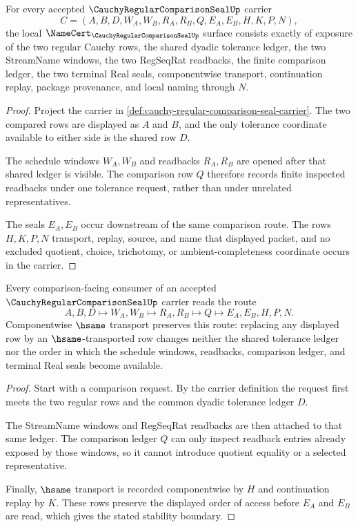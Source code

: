 \begin{theorem}
\label{thm:cauchy-regular-comparison-seal-obligations}
For every accepted $\CauchyRegularComparisonSealUp$ carrier
$$
C=(A,B,D,W_A,W_B,R_A,R_B,Q,E_A,E_B,H,K,P,N),
$$
the local $\NameCert_{\CauchyRegularComparisonSealUp}$ surface consists exactly of exposure of the two regular Cauchy rows, the shared dyadic tolerance ledger, the two StreamName windows, the two RegSeqRat readbacks, the finite comparison ledger, the two terminal Real seals, componentwise transport, continuation replay, package provenance, and local naming through $N$.
\end{theorem}
\begin{proof}
Project the carrier in \autoref{def:cauchy-regular-comparison-seal-carrier}. The two compared rows are displayed as $A$ and $B$, and the only tolerance coordinate available to either side is the shared row $D$.

The schedule windows $W_A,W_B$ and readbacks $R_A,R_B$ are opened after that shared ledger is visible. The comparison row $Q$ therefore records finite inspected readbacks under one tolerance request, rather than under unrelated representatives.

The seals $E_A,E_B$ occur downstream of the same comparison route. The rows $H,K,P,N$ transport, replay, source, and name that displayed packet, and no excluded quotient, choice, trichotomy, or ambient-completeness coordinate occurs in the carrier.
\end{proof}

\begin{theorem}
\label{thm:cauchy-regular-comparison-seal-stability}
Every comparison-facing consumer of an accepted $\CauchyRegularComparisonSealUp$ carrier reads the route
$$
A,B,D \longmapsto W_A,W_B \longmapsto R_A,R_B \longmapsto Q \longmapsto E_A,E_B,H,P,N .
$$
Componentwise $\hsame$ transport preserves this route: replacing any displayed row by an $\hsame$-transported row changes neither the shared tolerance ledger nor the order in which the schedule windows, readbacks, comparison ledger, and terminal Real seals become available.
\end{theorem}
\begin{proof}
Start with a comparison request. By the carrier definition the request first meets the two regular rows and the common dyadic tolerance ledger $D$.

The StreamName windows and RegSeqRat readbacks are then attached to that same ledger. The comparison ledger $Q$ can only inspect readback entries already exposed by those windows, so it cannot introduce quotient equality or a selected representative.

Finally, $\hsame$ transport is recorded componentwise by $H$ and continuation replay by $K$. These rows preserve the displayed order of access before $E_A$ and $E_B$ are read, which gives the stated stability boundary.
\end{proof}

